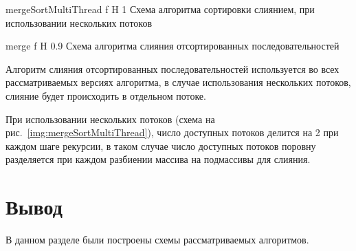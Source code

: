 {mergeSortMultiThread} %
{f} %
{H} %
{1\textwidth} %
{Схема алгоритма сортировки слиянием, при использовании нескольких потоков} %

{merge} %
{f} %
{H} %
{0.9\textwidth} %
{Схема алгоритма слияния отсортированных последовательностей} %

\newpage

Алгоритм слияния отсортированных последовательностей используется во всех рассматриваемых версиях алгоритма, в случае использования нескольких потоков, слияние будет происходить в отдельном потоке.

При использовании нескольких потоков (схема на рис.~\ref{img:mergeSortMultiThread}), число доступных потоков делится на 2 при каждом шаге рекурсии, в таком случае число доступных потоков поровну разделяется при каждом разбиении массива на подмассивы для слияния.

\section*{Вывод}

В данном разделе  были построены схемы рассматриваемых алгоритмов.

